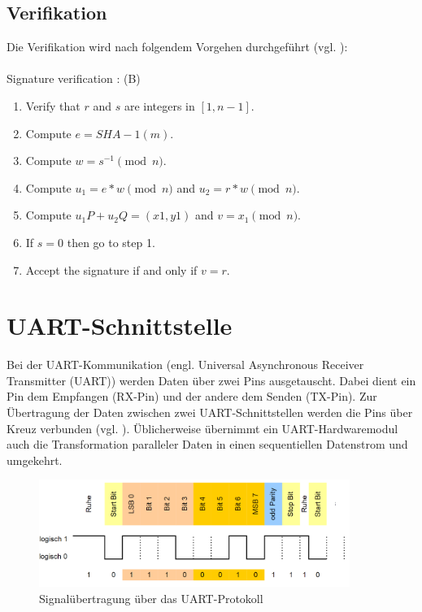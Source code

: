 \subsection{Verifikation}

Die Verifikation wird nach folgendem Vorgehen durchgeführt (vgl. \cite{hwimp}):
\\ \\
Signature verification : (B)
\begin{enumerate}
\item Verify that $r$ and $s$ are integers in $[1, n - 1]$.
\item Compute $e = SHA - 1(m)$.
\item Compute $w = s^{-1}\pmod{n}$.
\item Compute $u_1 = e * w \pmod{n}$ and $u_2 = r * w \pmod{n}$.
\item Compute $u_1 P + u_2 Q = (x1, y1)$ and $v = x_1 \pmod{n}$.
\item If $s = 0$ then go to step 1.
\item Accept the signature if and only if $v = r$.
\end{enumerate}






\section{UART-Schnittstelle} \label{sec:iuart}

Bei der UART-Kommunikation (engl. Universal Asynchronous Receiver Transmitter (UART)) werden Daten über zwei Pins ausgetauscht. Dabei dient ein Pin dem Empfangen (RX-Pin) und der andere dem Senden (TX-Pin). Zur Übertragung der Daten zwischen zwei UART-Schnittstellen werden die Pins über Kreuz verbunden (vgl. \cite{uart}). Üblicherweise übernimmt ein UART-Hardwaremodul auch die Transformation paralleler Daten in einen sequentiellen Datenstrom und umgekehrt.

\begin{figure}[H]
	\centering
   \includegraphics[width=0.90\textwidth]{bilder/uart}
	\caption{Signalübertragung über das UART-Protokoll}
	\label{fig:uart}
\end{figure}

